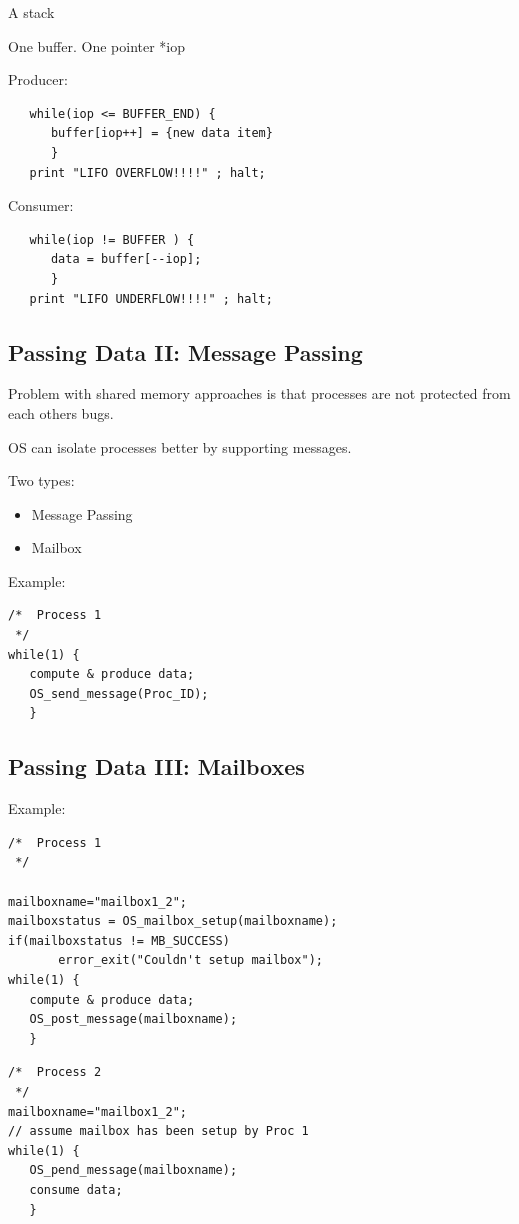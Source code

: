 \documentclass{article}	%
\begin{document}
A stack

One buffer.  One pointer *iop

Producer:
\begin{verbatim}
   while(iop <= BUFFER_END) {
      buffer[iop++] = {new data item}
      }
   print "LIFO OVERFLOW!!!!" ; halt;
\end{verbatim}
Consumer:

\begin{verbatim}
   while(iop != BUFFER ) {
      data = buffer[--iop];
      }
   print "LIFO UNDERFLOW!!!!" ; halt;
\end{verbatim}


\subsection{Passing Data II: Message Passing}
Problem with shared memory approaches is that processes are not protected from
each others bugs.

OS can isolate processes better by supporting messages.

Two types:
\begin{itemize}
	\item Message Passing
	\item Mailbox
\end{itemize}

Example:
\begin{verbatim}
/*  Process 1
 */
while(1) {
   compute & produce data;
   OS_send_message(Proc_ID);
   }
\end{verbatim}

\subsection{Passing Data III: Mailboxes}


Example:
\begin{verbatim}
/*  Process 1
 */

mailboxname="mailbox1_2";
mailboxstatus = OS_mailbox_setup(mailboxname);
if(mailboxstatus != MB_SUCCESS)
       error_exit("Couldn't setup mailbox");
while(1) {
   compute & produce data;
   OS_post_message(mailboxname);
   }
\end{verbatim}

\begin{verbatim}
/*  Process 2
 */
mailboxname="mailbox1_2";
// assume mailbox has been setup by Proc 1
while(1) {
   OS_pend_message(mailboxname);
   consume data;
   }
\end{verbatim}
\end{document}
